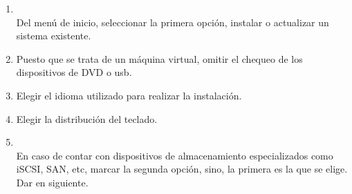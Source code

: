 \documentclass[11pt]{article}
\begin{document}
		\begin{enumerate}
			\item 
				\begin{minipage}[t]{\linewidth}
			          \raggedright
			          \medskip
			          \\Del menú de inicio, seleccionar la primera opción, instalar o actualizar un sistema existente.
			    \end{minipage}
			
			\item Puesto que se trata de un máquina virtual, omitir el chequeo de los dispositivos de DVD o usb.
			\item Elegir el idioma utilizado para realizar la instalación.
			\item Elegir la distribución del teclado.

			\item 
				\begin{minipage}[t]{\linewidth}
			          \raggedright
			          \medskip
			          \\En caso de contar con dispositivos de almacenamiento especializados como iSCSI, SAN, etc, marcar la segunda opción, sino, la primera es la que se elige. Dar en siguiente.
			    \end{minipage}			


\end{enumerate}
\end{document}
